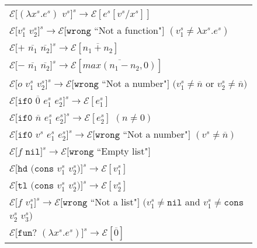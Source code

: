\begin{figure}[p]
\centering
\begin{tabular}{l}

$\mathscr{E}[(\lambda x^s.e^s)$ $v^s]^s\rightarrow\mathscr{E}[e^s[v^s/x^s]]$ \\

$\mathscr{E}[v^s_1$ $v^s_2]^s\rightarrow\mathscr{E}[\mathtt{wrong}$ ``Not a function"$]$ $(v^s_1\neq\lambda x^s.e^s)$ \\

$\mathscr{E}[+$ $\overline{n_1}$ $\overline{n_2}]^s\rightarrow\mathscr{E}[\overline{n_1+n_2}]$ \\

$\mathscr{E}[-$ $\overline{n_1}$ $\overline{n_2}]^s\rightarrow\mathscr{E}[\overline{max(n_1-n_2,0)}]$ \\

$\mathscr{E}[o$ $v^s_1$ $v^s_2]^s\rightarrow\mathscr{E}[\mathtt{wrong}$ ``Not a number"$]$ $(v^s_1\neq\overline{n}$ or $v^s_2\neq\overline{n})$ \\

$\mathscr{E}[\mathtt{if0}$ $\overline{0}$ $e^s_1$ $e^s_2]^s\rightarrow\mathscr{E}[e^s_1]$ \\

$\mathscr{E}[\mathtt{if0}$ $\overline{n}$ $e^s_1$ $e^s_2]^s\rightarrow\mathscr{E}[e^s_2]$ $(n\neq 0)$ \\

$\mathscr{E}[\mathtt{if0}$ $v^s$ $e^s_1$ $e^s_2]^s\rightarrow\mathscr{E}[\mathtt{wrong}$ ``Not a number"$]$ $(v^s\neq\overline{n})$ \\

$\mathscr{E}[f$ $\mathtt{nil}]^s\rightarrow\mathscr{E}[\mathtt{wrong}$ ``Empty list"$]$ \\

$\mathscr{E}[\mathtt{hd}$ $(\mathtt{cons}$ $v^s_1$ $v^s_2)]^s\rightarrow\mathscr{E}[v^s_1]$ \\

$\mathscr{E}[\mathtt{tl}$ $(\mathtt{cons}$ $v^s_1$ $v^s_2)]^s\rightarrow\mathscr{E}[v^s_2]$ \\

$\mathscr{E}[f$ $v^s_1]^s\rightarrow\mathscr{E}[\mathtt{wrong}$ ``Not a list"$]$ $(v^s_1\neq\mathtt{nil}$ and $v^s_1\neq\mathtt{cons}$ $v^s_2$ $v^s_3)$ \\

$\mathscr{E}[\mathtt{fun?}$ $(\lambda x^s.e^s)]^s\rightarrow\mathscr{E}[\overline{0}]$ \\


\end{tabular}
\end{figure}
